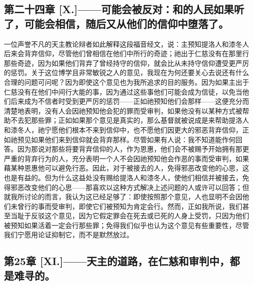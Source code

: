 \subsection{第二十四章 [X.]——可能会被反对：和的人民如果听了，可能会相信，随后又从他们的信仰中堕落了。}

一位声誉不凡的天主教论辩者如此解释这段福音经文，说：主预知提洛人和漆冬人后来会背弃信仰，尽管他们曾相信在他们中所行的奇迹；祂出于仁慈没有在那里行那些奇迹，因为如果他们背弃了曾经持守的信仰，就会比从未持守信仰遭受更严厉的惩罚。关于这位博学且非常敏锐之人的意见，我现在为何还要关心去说还有什么合理的问题可问呢？因为即使这个意见也为我所追求的目的服务。因为如果主出于仁慈没有在他们中间行大能的事，因为通过这些事他们可能会成为信徒，以免当他们后来成为不信者时受到更严厉的惩罚——正如祂预知他们会那样——这便充分而清楚地表明，没有人会因祂预知他会犯的罪而受审判，如果他没有以某种方式被帮助不去犯那些罪；正如如果那个意见是真实的，那么基督就被说成是来帮助提洛人和漆冬人，祂宁愿他们根本不来到信仰中，也不愿他们因更大的邪恶背弃信仰，正如祂预见如果他们来到信仰就会背弃那样。尽管如果有人说：我不知道能作何回答。因为那说对那些将要背弃信仰的人，作为恩惠，他们会不被赐予开始拥有那更严重的背弃行为的人，充分表明一个人不会因祂预知他会作恶的事而受审判，如果藉某种恩惠他可以避免行恶。因此，对于被接去的人，免得邪恶改变他的心思，这也是有益的。但为什么这益处没有赐给提洛人和漆冬人，使他们相信并被接去，免得邪恶改变他们的心思——那喜欢以这种方式解决上述问题的人或许可以回答；但就我所讨论的而言，我认为这已经足够了：即使按照那个意见，人也显明不会因他们未曾行的事而受审判，即使它们被预知为肯定会行。然而，正如我所说，我们甚至当耻于反驳这个意见，因为它假定罪会在死去或已死的人身上受罚，只因为他们被预知如果活着一定会行那些罪；免得我们似乎也认为这个意见有些重要性，尽管我们宁愿用论证抑制它，而不是默然放过。\par


\subsection{第25章 [XI.]——天主的道路，在仁慈和审判中，都是难寻的。}

